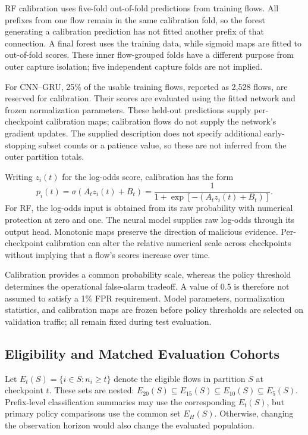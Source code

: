 \documentclass[conference]{IEEEtran}
\begin{document}
RF calibration uses five-fold out-of-fold predictions from training flows. All prefixes from one flow remain in the same calibration fold, so the forest generating a calibration prediction has not fitted another prefix of that connection. A final forest uses the training data, while sigmoid maps are fitted to out-of-fold scores. These inner flow-grouped folds have a different purpose from outer capture isolation; five independent capture folds are not implied.

For CNN--GRU, 25\% of the usable training flows, reported as 2,528 flows, are reserved for calibration. Their scores are evaluated using the fitted network and frozen normalization parameters. These held-out predictions supply per-checkpoint calibration maps; calibration flows do not supply the network's gradient updates. The supplied description does not specify additional early-stopping subset counts or a patience value, so these are not inferred from the outer partition totals.

Writing $z_i(t)$ for the log-odds score, calibration has the form
\begin{equation}
p_i(t)=\sigma\!\left(A_tz_i(t)+B_t\right)
=\frac{1}{1+\exp[-(A_tz_i(t)+B_t)]}.
\label{eq:platt_map}
\end{equation}
For RF, the log-odds input is obtained from its raw probability with numerical protection at zero and one. The neural model supplies raw log-odds through its output head. Monotonic maps preserve the direction of malicious evidence. Per-checkpoint calibration can alter the relative numerical scale across checkpoints without implying that a flow's scores increase over time.

Calibration provides a common probability scale, whereas the policy threshold determines the operational false-alarm tradeoff. A value of 0.5 is therefore not assumed to satisfy a 1\% FPR requirement. Model parameters, normalization statistics, and calibration maps are frozen before policy thresholds are selected on validation traffic; all remain fixed during test evaluation.

\subsection{Eligibility and Matched Evaluation Cohorts}
Let $E_t(S)=\{i\in S:n_i\ge t\}$ denote the eligible flows in partition $S$ at checkpoint $t$. These sets are nested: $E_{20}(S)\subseteq E_{15}(S)\subseteq E_{10}(S)\subseteq E_5(S)$. Prefix-level classification summaries may use the corresponding $E_t(S)$, but primary policy comparisons use the common set $E_H(S)$. Otherwise, changing the observation horizon would also change the evaluated population.
\end{document}
